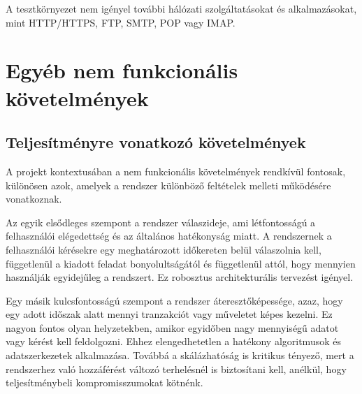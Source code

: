 \documentclass{scrreprt}
\begin{document}
A tesztkörnyezet nem igényel további hálózati szolgáltatásokat és alkalmazásokat, mint HTTP/HTTPS, FTP, SMTP, POP vagy IMAP.

\chapter{Egyéb nem funkcionális követelmények}

\section{Teljesítményre vonatkozó követelmények}
A projekt kontextusában a nem funkcionális követelmények rendkívül fontosak, különösen azok, amelyek a rendszer különböző feltételek melleti működésére
vonatkoznak.

Az egyik elsődleges szempont a rendszer válaszideje, ami létfontosságú a felhasználói elégedettség és az általános hatékonyság miatt. A rendszernek a
felhasználói kérésekre egy meghatározott időkereten belül válaszolnia kell, függetlenül a kiadott feladat bonyolultságától és függetlenül attól, hogy mennyien
használják egyidejűleg a rendszert. Ez robosztus architekturális tervezést igényel.

Egy másik kulcsfontosságú szempont a rendszer áteresztőképessége, azaz, hogy egy adott időszak alatt mennyi tranzakciót vagy műveletet képes kezelni. Ez nagyon
fontos olyan helyzetekben, amikor egyidőben nagy mennyiségű adatot vagy kérést kell feldolgozni. Ehhez elengedhetetlen a hatékony algoritmusok és
adatszerkezetek alkalmazása. Továbbá a skálázhatóság is kritikus tényező, mert a rendszerhez való hozzáférést változó terhelésnél is biztosítani kell, anélkül,
hogy teljesítménybeli kompromisszumokat kötnénk.
\end{document}
